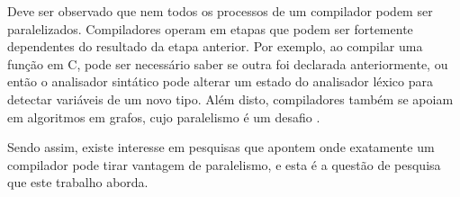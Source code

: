 Deve ser observado que nem todos os processos de um compilador podem ser
paralelizados. Compiladores operam em etapas que podem ser fortemente
dependentes do resultado da etapa anterior. Por exemplo, ao compilar uma
função em C, pode ser necessário saber se outra foi declarada anteriormente, ou
então o analisador sintático pode alterar um estado do analisador léxico para
detectar variáveis de um novo tipo. Além disto, compiladores também se apoiam em algoritmos
em grafos, cujo paralelismo é um desafio \citep{lumsdaine2007challenges}.

Sendo assim, existe interesse em pesquisas que apontem onde exatamente um compilador
pode tirar vantagem de paralelismo, e esta é a questão de pesquisa que este
trabalho aborda.



